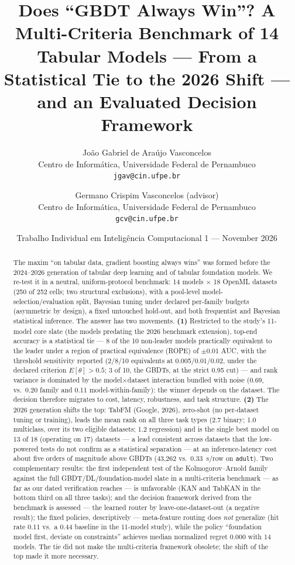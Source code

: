 \documentclass[11pt]{article}
\title{\textbf{Does ``GBDT Always Win''? A Multi-Criteria Benchmark of 14
Tabular Models --- From a Statistical Tie to the 2026 Shift --- and an
Evaluated Decision Framework}}
\author{João Gabriel de Araújo Vasconcelos\\
  \small Centro de Informática, Universidade Federal de Pernambuco\\
  \small \texttt{jgav@cin.ufpe.br}
  \and
  Germano Crispim Vasconcelos (advisor)\\
  \small Centro de Informática, Universidade Federal de Pernambuco\\
  \small \texttt{gcv@cin.ufpe.br}}
\date{Trabalho Individual em Inteligência Computacional 1 --- November 2026}
\newcommand{\us}{\textmu s}
\begin{document}
\maketitle

\begin{abstract}
The maxim ``on tabular data, gradient boosting always wins'' was formed
before the 2024--2026 generation of tabular deep learning and of tabular
foundation models. We re-test it in a neutral, uniform-protocol benchmark:
14 models $\times$ 18 OpenML datasets (250 of 252 cells; two structural
exclusions), with a pool-level model-selection/evaluation split, Bayesian tuning under declared
per-family budgets (asymmetric by design), a fixed untouched hold-out, and both
frequentist and Bayesian statistical inference. The answer has two
movements. \textbf{(1)} Restricted to the study's 11-model core slate (the models predating the
2026 benchmark extension), top-end accuracy is a statistical tie --- 8 of the 10 non-leader models practically
equivalent to the leader under a region of practical equivalence (ROPE) of
$\pm$0.01 AUC, with the threshold sensitivity reported (2/8/10 equivalents
at 0.005/0.01/0.02, under the declared criterion $E[\theta]>0.5$;
3 of 10, the GBDTs, at the strict 0.95 cut) --- and rank variance is
dominated by the model$\times$dataset interaction bundled with noise
(0.69, vs.\ 0.20
family and 0.11 model-within-family): the winner depends on the
dataset. The
decision therefore migrates to cost, latency, robustness, and task
structure. \textbf{(2)} The 2026 generation shifts the top: TabFM (Google,
2026), zero-shot (no per-dataset tuning or training), leads the mean rank
on all three task types (2.7 binary; 1.0 multiclass, over its two eligible
datasets; 1.2 regression) and is the single best model on 13 of 18
(operating on 17)
datasets --- a lead consistent across datasets that the low-powered
tests do not confirm as a statistical separation --- at an inference-latency cost about five orders of magnitude
above GBDTs (43,262 vs.\ 0.33~\us/row on \texttt{adult}). Two
complementary results: the first independent test of the
Kolmogorov--Arnold family against the full GBDT/DL/foundation-model slate
in a multi-criteria benchmark --- as far as our dated verification reaches
--- is unfavorable (KAN and TabKAN in the bottom third on all three
tasks); and the decision framework
derived from the benchmark is assessed --- the learned router by
leave-one-dataset-out (a negative result); the fixed policies,
descriptively ---
meta-feature routing does \emph{not} generalize (hit rate 0.11 vs.\ a 0.44
baseline in the 11-model study), while the policy ``foundation model first, deviate on
constraints'' achieves median normalized regret 0.000 with 14 models. The
tie did not make the multi-criteria framework obsolete; the shift of
the top made it
more necessary.
\end{abstract}
\end{document}
